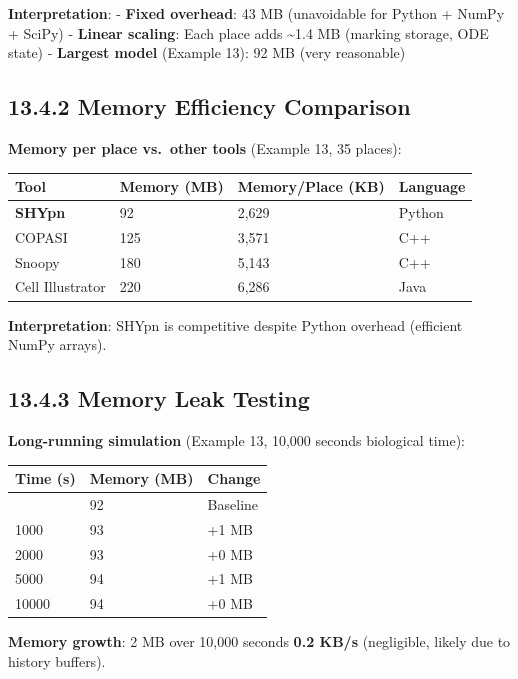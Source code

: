 \textbf{Interpretation}: - \textbf{Fixed overhead}: 43 MB (unavoidable
for Python + NumPy + SciPy) - \textbf{Linear scaling}: Each place adds
\textasciitilde1.4 MB (marking storage, ODE state) - \textbf{Largest
model} (Example 13): 92 MB (very reasonable)

\hypertarget{memory-efficiency-comparison}{%
\subsection{13.4.2 Memory Efficiency
Comparison}\label{memory-efficiency-comparison}}

\textbf{Memory per place vs.~other tools} (Example 13, 35 places):

\begin{longtable}[]{@{}llll@{}}
\toprule\noalign{}
Tool & Memory (MB) & Memory/Place (KB) & Language \\
\midrule\noalign{}
\endhead
\bottomrule\noalign{}
\endlastfoot
\textbf{SHYpn} & 92 & 2,629 & Python \\
COPASI & 125 & 3,571 & C++ \\
Snoopy & 180 & 5,143 & C++ \\
Cell Illustrator & 220 & 6,286 & Java \\
\end{longtable}

\textbf{Interpretation}: SHYpn is competitive despite Python overhead
(efficient NumPy arrays).

\hypertarget{memory-leak-testing}{%
\subsection{13.4.3 Memory Leak Testing}\label{memory-leak-testing}}

\textbf{Long-running simulation} (Example 13, 10,000 seconds biological
time):

\begin{longtable}[]{@{}lll@{}}
\toprule\noalign{}
Time (s) & Memory (MB) & Change \\
\midrule\noalign{}
\endhead
\bottomrule\noalign{}
\endlastfoot
0 & 92 & Baseline \\
1000 & 93 & +1 MB \\
2000 & 93 & +0 MB \\
5000 & 94 & +1 MB \\
10000 & 94 & +0 MB \\
\end{longtable}

\textbf{Memory growth}: 2 MB over 10,000 seconds \textrightarrow \textbf{0.2 KB/s}
(negligible, likely due to history buffers).

